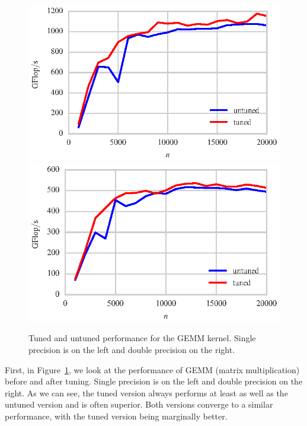 \documentclass[a4paper,12pt]{article}
\begin{document}
\begin{figure}[ht]
  \centering
  \includegraphics[scale=0.85]{fig/tuned_sgemm.eps}
  \includegraphics[scale=0.85]{fig/tuned_dgemm.eps}
  \caption{Tuned and untuned performance for the GEMM kernel. Single
    precision is on the left and double precision on the right.
    \label{fig.tuned_gemm} }
\end{figure}
First, in Figure~\ref{fig.tuned_gemm},
we look at the performance of GEMM (matrix multiplication)
before and after tuning.
Single precision is on the left and double precision on the right.
As we can see,
the tuned version always performs at least as well as
the untuned version and is often superior.
Both versions converge to a similar performance,
with the tuned version being marginally better.
\end{document}
